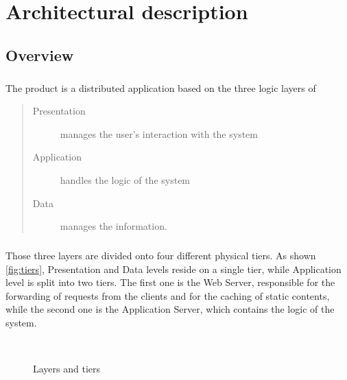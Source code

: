 	\chapter{Architectural description}
		\section{Overview}
			\paragraph{}
				The product is a distributed application based on the three logic layers of
				\begin{quote}
					\begin{description}
						\item[Presentation] manages the user's interaction with the system
						\item[Application] handles the logic of the system
						\item[Data] manages the information.
					\end{description}
				\end{quote}				 
			\paragraph{}
				Those three layers are divided onto four different physical tiers. As shown \ref{fig:tiers}, Presentation and Data levels reside on a single tier, while Application level is split into two tiers. The first one is the Web Server, responsible for the forwarding of requests from the clients and for the caching of static contents, while the second one is the Application Server, which contains the logic of the system.
				\begin{figure}
					\caption{Layers and tiers}
					\
				\end{figure}